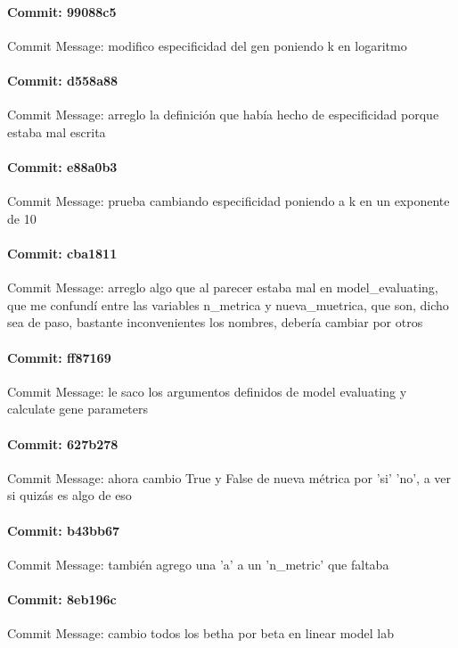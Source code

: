 \documentclass{article}
\begin{document}
\paragraph{Commit: 99088c5}
Commit Message: modifico especificidad del gen poniendo k en logaritmo

\paragraph{Commit: d558a88}
Commit Message: arreglo la definición que había hecho de especificidad porque estaba mal escrita

\paragraph{Commit: e88a0b3}
Commit Message: prueba cambiando especificidad poniendo a k en un exponente de 10

\paragraph{Commit: cba1811}
Commit Message: arreglo algo que al parecer estaba mal en model_evaluating, que me confundí entre las variables n_metrica y nueva_muetrica, que son, dicho sea de paso, bastante inconvenientes los nombres, debería cambiar por otros

\paragraph{Commit: ff87169}
Commit Message: le saco los argumentos definidos de model evaluating y calculate gene parameters

\paragraph{Commit: 627b278}
Commit Message: ahora cambio True y False de nueva métrica por 'si' 'no', a ver si quizás es algo de eso

\paragraph{Commit: b43bb67}
Commit Message: también agrego una 'a' a un 'n_metric' que faltaba

\paragraph{Commit: 8eb196c}
Commit Message: cambio todos los betha por beta en linear model lab
\end{document}
